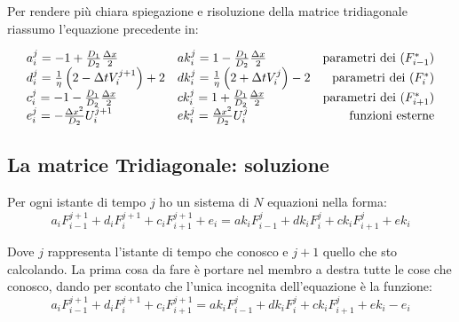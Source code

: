 \documentclass[]{article}
\newcommand{\lr}[3]{\ensuremath{\left#1 #3 \right#2}}
\newcommand{\lrt}[1]{\lr{(}{)}{#1}}
\numberwithin{equation}{subsection}
\begin{document}
Per rendere pi\`u chiara spiegazione e risoluzione della matrice tridiagonale riassumo l'equazione precedente in:

\begin{equation}\label{eq:pararametri}
\begin{array}{ll r}
a_i^j = -1+\frac{D_1}{D_2}\frac{\Delta x}2             & ak_i^j =1-\frac{D_1}{D_2}\frac{\Delta x}2&\text{parametri dei }(F^*_{i-1})\\
d_i^j = \frac1\eta\lrt{2-\Delta t V_i^{j+1}} +2 & dk_i^j = \frac1\eta\lrt{2+\Delta tV_i^{j}} -2 &\text{parametri dei }(F^*_{i})\\
c_i^j = -1-\frac{D_1}{D_2}\frac{\Delta x}2             & ck_i^j =1+\frac{D_1}{D_2}\frac{\Delta x}2&\text{parametri dei }(F^*_{i+1})\\
e_i^j = -\frac{\Delta x^2}{D_2} U_i^{j+1}              & ek_i^j =\frac{\Delta x^2}{D_2} U_i^{j}&\text{funzioni esterne}
\end{array}
\end{equation}
\subsection{La matrice Tridiagonale: soluzione}\label{section:soluzionetri}
Per ogni istante di tempo $j$ ho un sistema di $N$ equazioni nella forma:
\begin{equation}
a_{i} F_{i-1}^{j+1}+d_i F_{i}^{j+1} +c_{i}F_{i+1}^{j+1}  + e_i= 
ak_i F_{i-1}^{j}+ dk_i F_{i}^{j} + ck_i F_{i+1}^{j} + ek_i
\end{equation}

Dove $j$ rappresenta l'istante di tempo che conosco e $j+1$ quello che sto calcolando. La prima cosa da fare \`e portare nel membro a destra tutte le cose che conosco, dando per scontato che l'unica incognita dell'equazione \`e la funzione:
\begin{equation}
a_{i} F_{i-1}^{j+1}+d_i F_{i}^{j+1} +c_{i}F_{i+1}^{j+1}= 
ak_i F_{i-1}^{j}+ dk_i F_{i}^{j} + ck_i F_{i+1}^{j} + ek_i - e_i
\end{equation}
\end{document}
